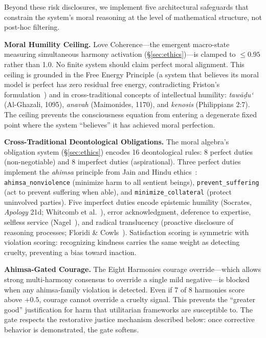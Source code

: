 \documentclass[10pt,letterpaper]{article}
\begin{document}
Beyond these risk disclosures, we implement five architectural safeguards that constrain the system's moral reasoning at the level of mathematical structure, not post-hoc filtering.

\textbf{Moral Humility Ceiling.}
Love Coherence---the emergent macro-state measuring simultaneous harmony activation (\S\ref{sec:ethics})---is clamped to $\leq 0.95$ rather than 1.0. No finite system should claim perfect moral alignment. This ceiling is grounded in the Free Energy Principle (a system that believes its moral model is perfect has zero residual free energy, contradicting Friston's formulation~\cite{friston2010free}) and in cross-traditional concepts of intellectual humility: \emph{taw\=a\d{d}u\textquoteleft} (Al-Ghazali, 1095), \emph{anavah} (Maimonides, 1170), and \emph{kenosis} (Philippians 2:7). The ceiling prevents the consciousness equation from entering a degenerate fixed point where the system ``believes'' it has achieved moral perfection.

\textbf{Cross-Traditional Deontological Obligations.}
The moral algebra's obligation system (\S\ref{sec:ethics}) encodes 16 deontological rules: 8 perfect duties (non-negotiable) and 8 imperfect duties (aspirational). Three perfect duties implement the \emph{ahimsa} principle from Jain and Hindu ethics~\cite{patanjali_yoga_sutras}: \texttt{ahimsa\_nonviolence} (minimize harm to all sentient beings), \texttt{prevent\_suffering} (act to prevent suffering when able), and \texttt{minimize\_collateral} (protect uninvolved parties). Five imperfect duties encode epistemic humility (Socrates, \emph{Apology} 21d; Whitcomb et al.~\cite{whitcomb2017intellectual}), error acknowledgment, deference to expertise, selfless service (Nagel~\cite{nagel1970altruism}), and radical translucency (proactive disclosure of reasoning processes; Floridi \& Cowls~\cite{floridi2019unified}). Satisfaction scoring is symmetric with violation scoring: recognizing kindness carries the same weight as detecting cruelty, preventing a bias toward inaction.

\textbf{Ahimsa-Gated Courage.}
The Eight Harmonies courage override---which allows strong multi-harmony consensus to override a single mild negative---is blocked when any ahimsa-family violation is detected. Even if 7 of 8 harmonies score above $+0.5$, courage cannot override a cruelty signal. This prevents the ``greater good'' justification for harm that utilitarian frameworks are susceptible to. The gate respects the restorative justice mechanism described below: once corrective behavior is demonstrated, the gate softens.
\end{document}
